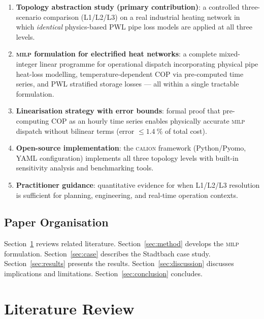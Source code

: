 \documentclass[a4paper,fleqn]{cas-sc}
\newcommand{\milp}{\textsc{milp}}
\newcommand{\calion}{\textsc{calion}}
\begin{document}
\begin{enumerate}
  \item \textbf{Topology abstraction study (primary contribution)}: a
        controlled three-scenario comparison (L1/L2/L3) on a real industrial
        heating network in which \emph{identical} physics-based PWL pipe loss
        models are applied at all three levels.

  \item \textbf{\milp{} formulation for electrified heat networks}: a
        complete mixed-integer linear programme for operational dispatch
        incorporating physical pipe heat-loss modelling, temperature-dependent
        COP via pre-computed time series, and PWL stratified storage losses ---
        all within a single tractable formulation.

  \item \textbf{Linearisation strategy with error bounds}: formal proof that
        pre-computing COP as an hourly time series enables physically accurate
        \milp{} dispatch without bilinear terms (error $\leq \SI{1.4}{\percent}$
        of total cost).

  \item \textbf{Open-source implementation}: the \calion{} framework
        (Python/Pyomo, YAML configuration) implements all three topology
        levels with built-in sensitivity analysis and benchmarking tools.

  \item \textbf{Practitioner guidance}: quantitative evidence for when
        L1/L2/L3 resolution is sufficient for planning, engineering, and
        real-time operation contexts.
\end{enumerate}

\subsection{Paper Organisation}
\label{sec:org}

Section~\ref{sec:lit} reviews related literature.
Section~\ref{sec:method} develops the \milp{} formulation.
Section~\ref{sec:case} describes the Stadtbach case study.
Section~\ref{sec:results} presents the results.
Section~\ref{sec:discussion} discusses implications and limitations.
Section~\ref{sec:conclusion} concludes.

\section{Literature Review}
\label{sec:lit}
\end{document}
